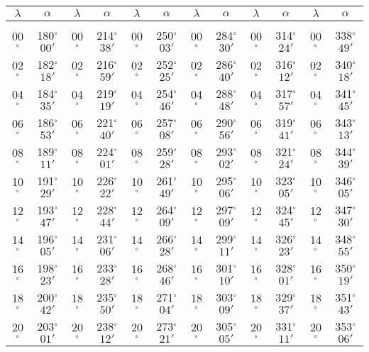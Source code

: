 \begin{table}
{\begin{tabular}{cc|cc|cc|cc|cc|cc}
$\lambda$& $\alpha$& $\lambda$& $\alpha$& $\lambda$& $\alpha$& $\lambda$& $\alpha$& $\lambda$& $\alpha$& $\lambda$& $\alpha$\\\hline
&&&&&&&&&&&\\[-2ex]
00$^\circ$ & 180$^\circ$$00'$ & 00$^\circ$ & 214$^\circ$$38'$ & 00$^\circ$ & 250$^\circ$$03'$ & 00$^\circ$ & 284$^\circ$$30'$ &  00$^\circ$ & 314$^\circ$$24'$ & 00$^\circ$ & 338$^\circ$$49'$\\
02$^\circ$ & 182$^\circ$$18'$ & 02$^\circ$ & 216$^\circ$$59'$ & 02$^\circ$ & 252$^\circ$$25'$ & 02$^\circ$ & 286$^\circ$$40'$ &  02$^\circ$ & 316$^\circ$$12'$ & 02$^\circ$ & 340$^\circ$$18'$\\
04$^\circ$ & 184$^\circ$$35'$ & 04$^\circ$ & 219$^\circ$$19'$ & 04$^\circ$ & 254$^\circ$$46'$ & 04$^\circ$ & 288$^\circ$$48'$ &  04$^\circ$ & 317$^\circ$$57'$ & 04$^\circ$ & 341$^\circ$$45'$\\
06$^\circ$ & 186$^\circ$$53'$ & 06$^\circ$ & 221$^\circ$$40'$ & 06$^\circ$ & 257$^\circ$$08'$ & 06$^\circ$ & 290$^\circ$$56'$ &  06$^\circ$ & 319$^\circ$$41'$ & 06$^\circ$ & 343$^\circ$$13'$\\
08$^\circ$ & 189$^\circ$$11'$ & 08$^\circ$ & 224$^\circ$$01'$ & 08$^\circ$ & 259$^\circ$$28'$ & 08$^\circ$ & 293$^\circ$$02'$ &  08$^\circ$ & 321$^\circ$$24'$ & 08$^\circ$ & 344$^\circ$$39'$\\
10$^\circ$ & 191$^\circ$$29'$ & 10$^\circ$ & 226$^\circ$$22'$ & 10$^\circ$ & 261$^\circ$$49'$ & 10$^\circ$ & 295$^\circ$$06'$ &  10$^\circ$ & 323$^\circ$$05'$ & 10$^\circ$ & 346$^\circ$$05'$\\
12$^\circ$ & 193$^\circ$$47'$ & 12$^\circ$ & 228$^\circ$$44'$ & 12$^\circ$ & 264$^\circ$$09'$ & 12$^\circ$ & 297$^\circ$$09'$ &  12$^\circ$ & 324$^\circ$$45'$ & 12$^\circ$ & 347$^\circ$$30'$\\
14$^\circ$ & 196$^\circ$$05'$ & 14$^\circ$ & 231$^\circ$$06'$ & 14$^\circ$ & 266$^\circ$$28'$ & 14$^\circ$ & 299$^\circ$$11'$ &  14$^\circ$ & 326$^\circ$$23'$ & 14$^\circ$ & 348$^\circ$$55'$\\
16$^\circ$ & 198$^\circ$$23'$ & 16$^\circ$ & 233$^\circ$$28'$ & 16$^\circ$ & 268$^\circ$$46'$ & 16$^\circ$ & 301$^\circ$$10'$ &  16$^\circ$ & 328$^\circ$$01'$ & 16$^\circ$ & 350$^\circ$$19'$\\
18$^\circ$ & 200$^\circ$$42'$ & 18$^\circ$ & 235$^\circ$$50'$ & 18$^\circ$ & 271$^\circ$$04'$ & 18$^\circ$ & 303$^\circ$$09'$ &  18$^\circ$ & 329$^\circ$$37'$ & 18$^\circ$ & 351$^\circ$$43'$\\
20$^\circ$ & 203$^\circ$$01'$ & 20$^\circ$ & 238$^\circ$$12'$ & 20$^\circ$ & 273$^\circ$$21'$ & 20$^\circ$ & 305$^\circ$$05'$ &  20$^\circ$ & 331$^\circ$$11'$ & 20$^\circ$ & 353$^\circ$$06'$\\

\end{tabular}}
\end{table}
